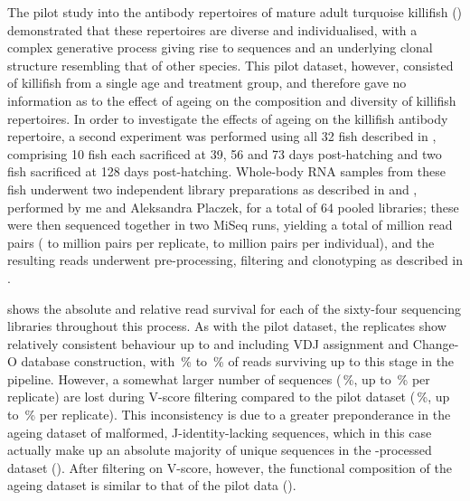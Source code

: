 The pilot study into the antibody repertoires of mature adult turquoise killifish () demonstrated that these repertoires are diverse and individualised, with a complex generative process giving rise to \naive sequences and an underlying clonal structure resembling that of other species. This pilot dataset, however, consisted of killifish from a single age and treatment group, and therefore gave no information as to the effect of ageing on the composition and diversity of killifish repertoires. In order to investigate the effects of ageing on the killifish antibody repertoire, a second \igseq experiment was performed using all 32 fish described in  , comprising 10 fish each sacrificed at 39, 56 and 73 days post-hatching and two fish sacrificed at 128 days post-hatching. Whole-body RNA samples from these fish underwent two independent library preparations as described in  and , performed by me and Aleksandra Placzek, for a total of 64 pooled libraries; these were then sequenced together in two MiSeq runs, yielding a total of  million read pairs ( to  million pairs per replicate,  to  million pairs per individual), and the resulting reads underwent pre-processing, filtering and clonotyping as described in .

 shows the absolute and relative read survival for each of the sixty-four sequencing libraries throughout this process. As with the pilot dataset, the replicates show relatively consistent behaviour up to and including VDJ assignment and Change-O database construction, with \,\% to \,\% of reads surviving up to this stage in the pipeline. However, a somewhat larger number of sequences (\,\%, up to \,\% per replicate) are lost during V-score filtering compared to the pilot dataset (\,\%, up to \,\% per replicate). This inconsistency is due to a greater preponderance in the ageing dataset of malformed, J-identity-lacking sequences, which in this case actually make up an absolute majority of unique sequences in the -processed dataset (). After filtering on V-score, however, the functional composition of the ageing dataset is similar to that of the pilot data ().


